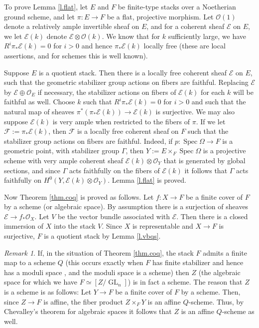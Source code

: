 \documentclass[12pt]{amsart}
\newcommand{\cO}{{\mathcal O}}
\newcommand{\cE}{{\mathcal E}}
\newcommand{\cF}{{\mathcal F}}
\DeclareMathOperator{\spec}{Spec}
\DeclareMathOperator{\GL}{GL}
\theoremstyle{plain}
\theoremstyle{definition}
\theoremstyle{remark}
\newtheorem {remark} [thm]  {Remark}
\begin{document}
\smallskip

To prove Lemma \ref{l.flat},
let $E$ and $F$ be  finite-type stacks over a Noetherian ground scheme,
and let $\pi\colon E\to F$ be a flat, projective morphism.
Let $\cO(1)$ denote a relatively ample invertible sheaf on $E$,
and for a coherent sheaf $\cE$ on $E$,
we let $\cE(k)$ denote $\cE\otimes\cO(k)$.
We know that for $k$ sufficiently large,
we have $R^i\pi_*\cE(k)=0$ for $i>0$ and hence $\pi_*\cE(k)$ locally free
(these are local assertions, and for schemes this is well known).

Suppose $E$ is a quotient stack.
Then there is a locally free coherent sheaf $\cE$ on $E$, such that the
geometric stabilizer group actions on fibers are faithful.
Replacing $\cE$ by $\cE\oplus\cO_E$ if necessary, the stabilizer actions
on fibers of $\cE(k)$ for each $k$ will be faithful as well.
Choose $k$ such that $R^i\pi_*\cE(k)=0$ for $i>0$
and such that the natural map of sheaves $\pi^*(\pi_*\cE(k))\to\cE(k)$
is surjective.
We may also suppose $\cE(k)$ is very ample when restricted to
the fibers of $\pi$.
If we let $\cF:=\pi_*\cE(k)$, then $\cF$ is a locally free coherent
sheaf on $F$ such that the stabilizer group actions on fibers
are faithful.
Indeed, if $p\colon \spec\Omega\to F$ is a geometric point,
with stabilizer group $\Gamma$,
then $Y:=E\times_F\spec\Omega$ is a projective scheme with very ample
coherent sheaf $\cE(k)\otimes\cO_Y$ that is generated by global sections,
and since $\Gamma$ acts faithfully on the fibers of $\cE(k)$
it follows that $\Gamma$ acts faithfully on $H^0(Y,\cE(k)\otimes\cO_Y)$.
Lemma \ref{l.flat} is proved.

\smallskip

Now Theorem \ref{thm.coq} is proved as follows.
Let $f\colon X \rightarrow F$ be a finite cover
of $F$ by a scheme (or algebraic space). By assumption
there is a surjection of sheaves ${\mathcal E} \rightarrow f_*{\mathcal
O}_X$. Let $V$ be the vector bundle associated with ${\mathcal E}$.
Then there is a closed immersion of $X$ into the stack $V$.
Since $X$ is representable and $X\rightarrow F$ is surjective,
$F$ is a quotient stack by Lemma \ref{l.vbqs}.

\begin{remark}
If, in the situation of Theorem \ref{thm.coq}, the stack $F$
admits a finite map to a scheme $Q$ (this occurs exactly when
$F$ has finite stabilizer and hence has a moduli space \cite{KM},
and the moduli space is a scheme) then
$Z$ (the algebraic space for which we have $F\simeq [Z/\GL_n]$)
is in fact a scheme.
The reason that $Z$ is a scheme is as follows:
Let $Y \rightarrow F$ be a finite cover of $F$ by a scheme.
Then, since $Z \rightarrow F$ is affine, the fiber product
$Z \times_F Y$ is an affine $Q$-scheme. Thus, by Chevalley's
theorem for algebraic spaces \cite[III.4.1]{Kn} it follows
that $Z$ is an affine $Q$-scheme as well.
\end{remark}
\end{document}
